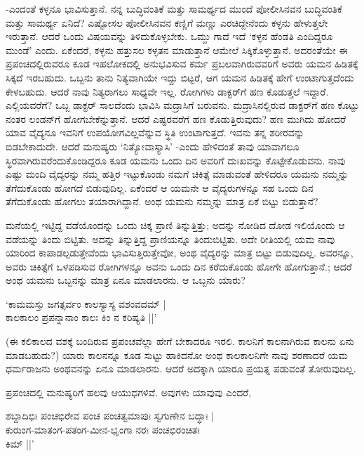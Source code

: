 -ಎಂದಂತೆ ಕಳ್ಳನೂ ಭಾವಿಸುತ್ತಾನೆ. ನನ್ನ ಬುದ್ಧಿವಂತಿಕೆ ಮತ್ತು ಸಾಮರ್ಥ್ಯದ ಮುಂದೆ ಪೋಲೀಸಿನವನ ಬುದ್ಧಿವಂತಿಕೆ ಮತ್ತು ಸಾಮರ್ಥ್ಯ ಏನಿದೆ? ಎಷ್ಟೋಸಲ ಪೋಲೀಸಿನವನ ಕಣ್ಣಿಗೆ ಮಣ್ಣು ಎರಚಿದ್ದೇನೆಂದು ಕಳ್ಳನು ಹೇಳುತ್ತಲೇ ಇರುತ್ತಾನೆ. ಆದರೆ ಒಂದು ವಿಷಯವನ್ನು ತಿಳಿದುಕೊಳ್ಳಬೇಕು. ಒಮ್ದು ಗಾದೆ ಇದೆ `ಕಳ್ಳನ ಹೆಂಡತಿ ಎಂದಿದ್ದರೂ ಮುಂಡೆ' ಎಂದು. ಏಕೆಂದರೆ, ಕಳ್ಳನು ಹತ್ತುಸಲ ಕಳ್ಳತನ ಮಾಡುತ್ತಾನೆ ಆಮೇಲೆ ಸಿಕ್ಕಿಕೊಳ್ಳುತ್ತಾನೆ. ಅದರಂತೆಯೇ ಈ ಪ್ರಪಂಚದಲ್ಲಿರುವರೂ ಕೂಡ ಇಹಲೋಕದಲ್ಲಿ ಅನುಭವಿಸುವ ಕರ್ಮ ಪ್ರಬಲವಾಗಿರುವವರಿಗೆ ಅವರು ಯಮನ ಹಿಡಿತಕ್ಕೆ ಸಿಕ್ಕದೆ ಇರಬಹುದು. ಒಬ್ಬನು ತಾನು ನಿತ್ಯವಾಗಿಯೇ ಇದ್ದು ಬಿಟ್ಟರೆ, ಆಗ ಯಮನ ಹಿಡಿತಕ್ಕೆ ಹೇಗೆ ಉಂಟಾಗುತ್ತದೆಂದು ಕೇಳಬಹುದು. ಆದರೆ ನಾವು ನಿತ್ಯರಾಗಲು ಸಾಧ್ಯವೇ ಇಲ್ಲ. ರೋಗಿಗಳು ಡಾಕ್ಟರ್‌ಗೆ ಹಣ ಕೊಡುತ್ತಲೆ ಇದ್ದಾರೆ. ಎಲ್ಲಿಯವರೆಗೆ? ಒಬ್ಬ ಡಾಕ್ಟರ್ ಸಾಲದೆಂದು ಭಾವಿಸಿ ಮದ್ರಾಸಿಗೆ ಬರುವನು. ಮದ್ರಾಸಿನಲ್ಲಿರುವ ಡಾಕ್ಟರ್‌ಗೆ ಹಣ ಕೊಟ್ಟು ನಂತರ ಲಂಡನ್‌ಗೆ ಹೋಗಬೇಕೆನ್ನುತ್ತಾನೆ. ಆದರೆ ಎಷ್ಟರವರೆಗೆ ಹಣ ಕೊಡುತ್ತಿರುವುದು? ಹಣ ಮುಗಿದು ಹೋದರೆ ಯಾವ ವೈದ್ಯನೂ ಇವನಿಗೆ ಉಪಯೋಗವಿಲ್ಲವೆನ್ನುವ ಸ್ಥಿತಿ ಉಂಟಾಗುತ್ತದೆ. ಇವನು ತನ್ನ ಶರೀರವನ್ನು ಬಿಡಬೇಕಾದುದೇ. ಆದರೆ ಮನುಷ್ಯರು `ನಿತ್ಯೋವಾಸ್ಯಾಸಿ' -ಎಂದು ಹೇಳಿದಂತೆ ತಾವು ಯಾವಾಗಲೂ ಸ್ಥಿರವಾಗಿರುವರೆಂದುಕೊಂಡಿದ್ದರೂ ಕೂಡ ಯಮನು ಒಂದು ದಿನ ಅವರಿಗೆ ದುಃಖವನ್ನು ಕೊಟ್ಟೇಕೊಡುವನು. ನಾವು ಎಷ್ಟು ಮಂದಿ ವೈದ್ಯರನ್ನು ನಮ್ಮ ಹತ್ತಿರ ಇಟ್ಟುಕೊಂಡು ನಮಗೆ ಚಿಕಿತ್ಸೆ ಮಾಡುವಂತೆ ಹೇಳಿದರೂ ಯಮನು ನಮ್ಮನ್ನು ತೆಗೆದುಕೊಂಡು ಹೋಗದೆ ಬಿಡುವುದಿಲ್ಲ. ಏಕೆಂದರೆ ಆ ಯಮನೇ ಆ ವೈದ್ಯರುಗಳನ್ನೂ ಸಹ ಒಂದು ದಿನ ತೆಗೆದುಕೊಂಡು ಹೋಗಲು ತಯಾರಾಗಿದ್ದಾನೆ. ಅಂಥ ಯಮನು ನಮ್ಮನ್ನು ಮಾತ್ರ ಏಕೆ ಬಿಟ್ಟು ಬಿಡುತ್ತಾನೆ?

ಮನೆಯಲ್ಲಿ ಇಟ್ಟಿದ್ದ ವಡೆಯೊಂದನ್ನು ಒಂದು ಚಿಕ್ಕ ಪ್ರಾಣಿ ತಿನ್ನುತ್ತಿತ್ತು; ಅದನ್ನು ನೋಡಿದ ದೋಡ ಇಲಿಯೊಂದು ಆ ವಡೆಯನ್ನು ತಿಂದು ಬಿಟ್ಟಿತು. ಅದನ್ನು ತಿನ್ನುತ್ತಿದ್ದ ಪ್ರಾಣಿಯನ್ನೂ ತಿಂದುಬಿಟ್ಟಿತು. ಅದೇ ರೀತಿಯಲ್ಲಿ ಯಮ ನಾವು ಯಾರಿಂದ ಕಾಪಾಡಲ್ಪಡುತ್ತೇವೆಂದು ಭಾವಿಸುತ್ತಿರುತ್ತೇವೋ, ಅಂಥ ವೈದ್ಯರನ್ನು ಮಾತ್ರ ಬಿಟ್ಟು ಬಿಡುವುದಿಲ್ಲ. ಅವರನ್ನೂ, ಅವರು ಚಿಕಿತ್ಸೆಗೆ ಒಳಪಡಿಸುವ ರೋಗಿಗಳನ್ನೂ ಅವನು ಒಂದು ದಿನ ಕರೆದುಕೊಂಡು ಹೋಗೇ ಹೋಗುತ್ತಾನೆ.; ಆದರೆ ಅಂಥ ಯಮನು ಒಬ್ಬನನ್ನು ಮಾತ್ರ ಏನೂ ಮಾಡಲಾರನು. ಆ ಒಬ್ಬನು ಯಾರು?

\begin{shloka}
`ಕಾಮಮಸ್ತು ಜಗತ್ಸರ್ವಂ ಕಾಲಸ್ಯಾಸ್ಯ ವಶಂವದಮ್ |\\
ಕಾಲಕಾಲಂ ಪ್ರಪನ್ನಾನಾಂ ಕಾಲಃ ಕಿಂ ನ ಕರಿಷ್ಯತಿ ||'
\end{shloka}

(ಈ ಕಲಿಕಾಲದ ವಶಕ್ಕೆ ಬಂದಿರುವ ಪ್ರಪಂಚವೆಲ್ಲಾ ಹೇಗೆ ಬೇಕಾದರೂ ಇರಲಿ. ಕಾಲನಿಗೆ ಕಾಲನಾಗಿರುವ ಕಾಲನು ಏನು ಮಾಡಬಹುದು?) ಯಾರು ಕಾಲನನ್ನೂ ಕೂಡ ಸುಟ್ಟು ಹಾಕಿದನೋ ಅಂಥ ಕಾಲಕಾಲನಿಗೇ ನಾವು ಶರಣಾದರೆ ಯಮ ಧರ್ಮರಾಜನು ಅಂಥವನನ್ನು ಏನೂ ಮಾಡಲಾರನು. ಆದರೆ ಅದಕ್ಕಾಗಿ ಯಾರೂ ಪ್ರಯತ್ನ ಪಡುವಂತೆ ತೋರುವುದಿಲ್ಲ.

ಪ್ರಪಂಚದಲ್ಲಿ ಮನುಷ್ಯರಿಗೆ ಹಲವು ಆಯುಧಗಳಿವೆ. ಅವುಗಳು ಯಾವುವು ಎಂದರೆ,

\begin{shloka}
ಶಬ್ದಾದಿಭಿಃ ಪಂಚಭಿರೇವ ಪಂಚ ಪಂಚತ್ವಮಾಪುಃ ಸ್ವಗುಣೇನ ಬದ್ಧಾಃ |\\
ಕುರುಂಗ-ಮಾತಂಗ-ಪತಂಗ-ಮೀನ-ಭೃಂಗಾ ನರಃ ಪಂಚಭಿರಂಚಿತಃ\\
\hspace{5.5cm} ಕಿಮ್ ||'
\end{shloka}

